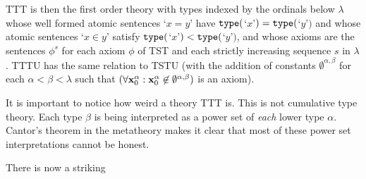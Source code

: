 \documentclass[112pt]{article}
\begin{document}
TTT is then the first order theory with types indexed by the ordinals below $\lambda$ whose well formed atomic sentences `$x=y$' have ${\tt type}($`$x$'$) = {\tt type}($`$y$'$)$ and whose atomic sentences `$x \in y$' satisfy ${\tt type}($`$x$'$) < {\tt type}($`$y$'$)$, and whose axioms are the sentences $\phi^s$ for each axiom $\phi$ of TST and each strictly increasing sequence $s$ in $\lambda$.  TTTU has the same relation to TSTU (with the addition of constants $\emptyset^{\alpha,\beta}$ for each $\alpha<\beta<\lambda$  such that $(\forall {\bf x}_0^{\alpha} :{\bf x}_0^{\alpha}\not\in \emptyset^{\alpha,\beta})$ is an axiom).

It is important to notice how weird a theory TTT is.  This is not cumulative type theory.  Each type $\beta$ is being interpreted as a power set of {\em each\/} lower type $\alpha$.  Cantor's theorem in the metatheory makes it clear that most of these power set interpretations cannot be honest.

There is now a striking
\end{document}
